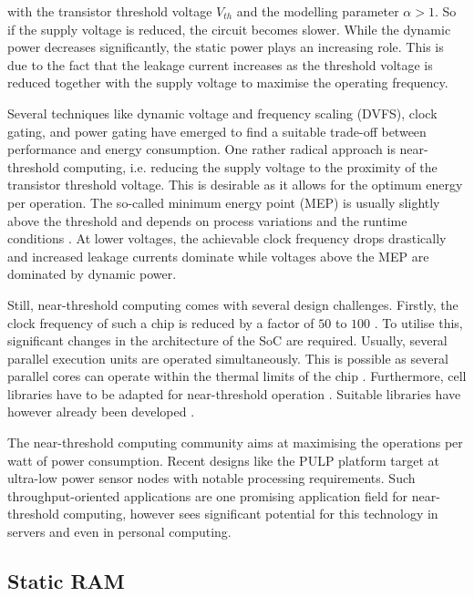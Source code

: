 \documentclass[conference]{IEEEtran}
\begin{document}
with the transistor threshold voltage $V_{th}$ and the modelling parameter $\alpha > 1$. So if the supply voltage is reduced, the circuit becomes slower. While the dynamic power decreases significantly, the static power plays an increasing role. This is due to the fact that the leakage current increases as the threshold voltage is reduced together with the supply voltage to maximise the operating frequency.

Several techniques like dynamic voltage and frequency scaling (DVFS), clock gating, and power gating have emerged to find a suitable trade-off between performance and energy consumption. One rather radical approach is near-threshold computing, i.e. reducing the supply voltage to the proximity of the transistor threshold voltage. This is desirable as it allows for the optimum energy per operation. The so-called minimum energy point (MEP) is usually slightly above the threshold and depends on process variations and the runtime conditions \cite{Golanbari2020}. At lower voltages, the achievable clock frequency drops drastically and increased leakage currents dominate while voltages above the MEP are dominated by dynamic power.

Still, near-threshold computing comes with several design challenges. Firstly, the clock frequency of such a chip is reduced by a factor of $50$ to $100$ \cite{Dreslinski2010}. To utilise this, significant changes in the architecture of the SoC are required. Usually, several parallel execution units are operated simultaneously. This is possible as several parallel cores can operate within the thermal limits of the chip \cite{Pinckney2017}. Furthermore, cell libraries have to be adapted for near-threshold operation \cite{De2017}. Suitable libraries have however already been developed \cite{Zhou2012}.

The near-threshold computing community aims at maximising the operations per watt of power consumption. Recent designs like the PULP platform \cite{Rossi2017} target at ultra-low power sensor nodes with notable processing requirements. Such throughput-oriented applications are one promising application field for near-threshold computing, however \cite{Dreslinski2010} sees significant potential for this technology in servers and even in personal computing.

\subsection{Static RAM} \label{sec:background:sram}
\end{document}

